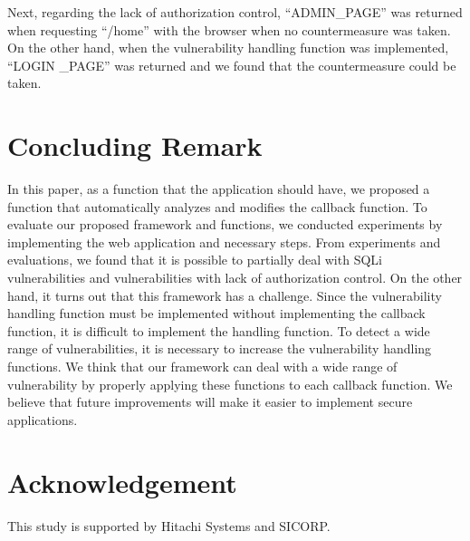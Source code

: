 \documentclass[conference]{IEEEtran}
\begin{document}
Next, regarding the lack of authorization control, ``ADMIN\_PAGE'' was returned when requesting ``/home'' with the browser when no countermeasure was taken.
On the other hand, when the vulnerability handling function was implemented, ``LOGIN \_PAGE'' was returned and we found that the countermeasure could be taken.

\section{Concluding Remark}
In this paper, as a function that the application should have, we proposed a function that automatically analyzes and modifies the callback function.
To evaluate our proposed framework and functions, we conducted experiments by implementing the web application and necessary steps.
From experiments and evaluations, we found that it is possible to partially deal with SQLi vulnerabilities and vulnerabilities with lack of authorization control.
On the other hand, it turns out that this framework has a challenge.
Since the vulnerability handling function must be implemented without implementing the callback function, it is difficult to implement the handling function.
To detect a wide range of vulnerabilities, it is necessary to increase the vulnerability handling functions.
We think that our framework can deal with a wide range of vulnerability by properly applying these functions to each callback function.
We believe that future improvements will make it easier to implement secure applications.

\section*{Acknowledgement}
This study is supported by Hitachi Systems and SICORP.



\end{document}
